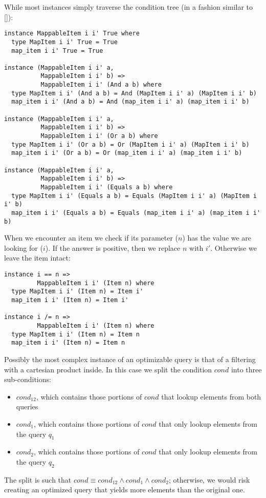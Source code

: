 While most instances simply traverse the condition tree (in a fashion similar to []):
\begin{lstlisting}
instance MappableItem i i' True where
  type MapItem i i' True = True
  map_item i i' True = True

instance (MappableItem i i' a,
          MappableItem i i' b) =>
          MappableItem i i' (And a b) where
  type MapItem i i' (And a b) = And (MapItem i i' a) (MapItem i i' b)
  map_item i i' (And a b) = And (map_item i i' a) (map_item i i' b)

instance (MappableItem i i' a,
          MappableItem i i' b) =>
          MappableItem i i' (Or a b) where
  type MapItem i i' (Or a b) = Or (MapItem i i' a) (MapItem i i' b)
  map_item i i' (Or a b) = Or (map_item i i' a) (map_item i i' b)

instance (MappableItem i i' a,
          MappableItem i i' b) =>
          MappableItem i i' (Equals a b) where
  type MapItem i i' (Equals a b) = Equals (MapItem i i' a) (MapItem i i' b)
  map_item i i' (Equals a b) = Equals (map_item i i' a) (map_item i i' b)
\end{lstlisting}

When we encounter an item we check if its parameter ($n$) has the value we are looking for ($i$). If the answer is positive, then we replace $n$ with $i'$. Otherwise we leave the item intact:
\begin{lstlisting}
instance i == n =>
         MappableItem i i' (Item n) where
  type MapItem i i' (Item n) = Item i'
  map_item i i' (Item n) = Item i'

instance i /= n =>
         MappableItem i i' (Item n) where
  type MapItem i i' (Item n) = Item n
  map_item i i' (Item n) = Item n
\end{lstlisting}

Possibly the most complex instance of an optimizable query is that of a filtering with a cartesian product inside. In this case we split the condition $cond$ into three sub-conditions:
\begin{itemize}
\item $cond_{12}$, which contains those portions of $cond$ that lookup elements from both queries
\item $cond_1$, which contains those portions of $cond$ that only lookup elements from the query $q_1$
\item $cond_2$, which contains those portions of $cond$ that only lookup elements from the query $q_2$
\end{itemize}
The split is such that $cond \equiv cond_{12} \wedge cond_1 \wedge cond_2$; otherwise, we would risk creating an optimized query that yields more elements than the original one.

